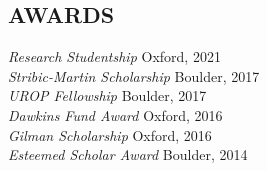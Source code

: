 \documentclass[margin]{res}
\begin{document}
\begin{resume}
                \section{AWARDS}
                
                {\sl Research Studentship} \hfill Oxford, 2021 \\
                {\sl Stribic-Martin Scholarship} \hfill Boulder, 2017 \\
                        {\sl UROP Fellowship} \hfill Boulder, 2017 \\
                        {\sl Dawkins Fund Award} \hfill Oxford, 2016 \\
                        {\sl Gilman Scholarship} \hfill Oxford, 2016 \\
                        {\sl Esteemed Scholar Award} \hfill Boulder, 2014 \\




                

\end{resume}
\end{document}
